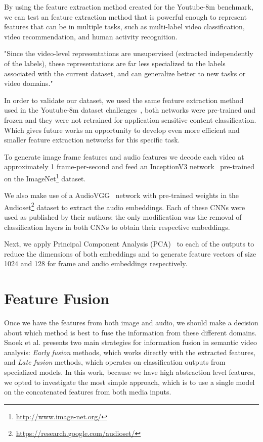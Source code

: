 

By using the feature extraction method created for the Youtube-8m benchmark, we can test an feature extraction method that is powerful enough to represent features that can be in multiple tasks, such as multi-label video classification, video recommendation, and human activity recognition.

"Since the video-level representations are unsupervised (extracted independently of the labels), these representations are far less specialized to the labels associated with the current dataset, and can generalize better to new tasks or video domains."~\cite{abu2016youtube}

In order to validate our dataset, we used the same feature extraction method used in the Youtube-8m dataset challenges~\cite{abu2016youtube}, both networks were pre-trained and frozen and they were not retrained for application sensitive content classification. Which gives future works an opportunity to develop even more efficient and smaller feature extraction networks for this specific task.


To generate image frame features and audio features we decode each video at approximately 1 frame-per-second and feed an InceptionV3  network~\cite{szegedy2016rethinking} pre-trained on the ImageNet\footnote{\url{http://www.image-net.org/}} dataset.
 
We also make use of a AudioVGG~\cite{hershey2017cnn} network with pre-trained weights in the Audioset\footnote{\url{https://research.google.com/audioset/}} dataset to extract the audio embeddings. Each of these CNNs were used as published by their authors; the only modification was the removal of classification layers in both CNNs to obtain their respective embeddings.

Next, we apply Principal Component Analysis (PCA)~\cite{wold1987principal} to each of the outputs to reduce the dimensions of both embeddings and to generate feature vectors of size 1024 and 128 for frame and audio embeddings respectively.

\section{Feature Fusion}
\label{sec:feature_fusion}

Once we have the features from both image and audio, we should make a decision about which method is best to fuse the information from these different domains. Snoek et al. \cite{snoek2005featurefusion} presents two main strategies for information fusion in semantic video analysis: \emph{Early fusion} methods, which works directly with the extracted features, and \emph{Late fusion} methods, which operates on classification outputs from specialized models.
In this work, because we have high abstraction level features, we opted to investigate the most simple approach, which is to use a single model on the concatenated features from both media inputs.

